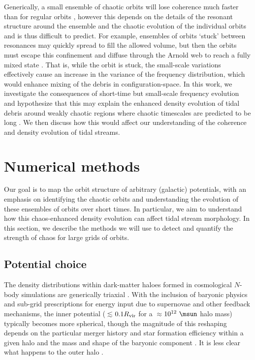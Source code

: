Generically, a small ensemble of chaotic orbits will lose coherence much faster
than for regular orbits \cite[see, e.g.,][]{kandrup94, merritt96, kandrup03},
however this depends on the details of the resonant structure around the
ensemble and the chaotic evolution of the individual orbits and is thus
difficult to predict. For example, ensembles of orbits `stuck' between
resonances may quickly spread to fill the allowed volume, but then the orbits
must escape this confinement and diffuse through the Arnold web to reach a fully
mixed state \citep{merritt96}. That is, while the orbit is stuck, the
small-scale variations effectively cause an increase in the variance of the
frequency distribution, which would enhance mixing of the debris in
configuration-space. In this work, we investigate the consequences of short-time
but small-scale frequency evolution and hypothesize that this may explain the
enhanced density evolution of tidal debris around weakly chaotic regions where
chaotic timescales are predicted to be long \citep[e.g.,][]{pearson15}. We then
discuss how this would affect our understanding of the coherence and density
evolution of tidal streams.

\section{Numerical methods}\label{sec:methods}

Our goal is to map the orbit structure of arbitrary (galactic) potentials, with
an emphasis on identifying the chaotic orbits and understanding the evolution of
these ensembles of orbits over short times. In particular, we aim to understand
how this chaos-enhanced density evolution can affect tidal stream morphology. In
this section, we describe the methods we will use to detect and quantify the
strength of chaos for large grids of orbits.

\subsection{Potential choice}\label{sec:potential}

The density distributions within dark-matter haloes formed in cosmological
$N$-body simulations are generically triaxial \citep[e.g.,][]{jing02, bett07,
zemp09, veraciro11}. With the inclusion of baryonic physics and sub-grid
prescriptions for energy input due to supernovae and other feedback mechanisms,
the inner potential ($\lesssim$$0.1R_{\rm vir}$ for a $\approx$$10^{12}~\msun$
halo mass) typically becomes more spherical, though the magnitude of this
reshaping depends on the particular merger history and star formation efficiency
within a given halo and the mass and shape of the baryonic component
\citep[e.g.,][though in Milky Way-like galaxies, baryonic disks will add
non-sphericity to the total potential]{dubinski94,kazantzidis04, debattista08,
bryan13, butsky15}. It is less clear what happens to the outer halo
\citep[e.g.,][]{zemp11, valluri13}.

